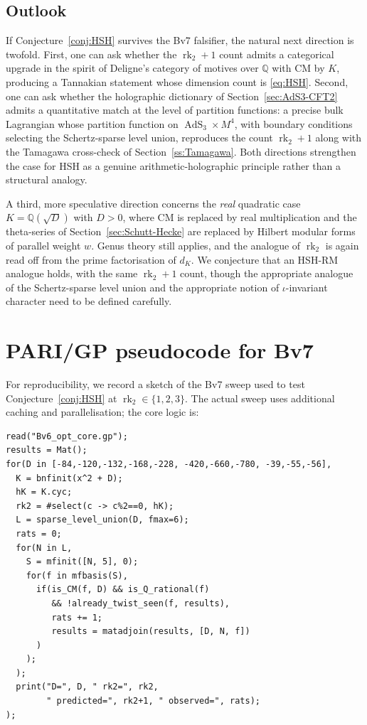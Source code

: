 \documentclass[11pt,a4paper]{amsart}
\theoremstyle{definition}
\DeclareMathOperator{\rk}{rk}
\DeclareMathOperator{\AdS}{AdS}
\newcommand{\Q}{\mathbb{Q}}
\newcommand{\rktwo}{\rk_{2}}
\begin{document}
\subsection{Outlook}\label{ss:outlook}

If Conjecture~\ref{conj:HSH} survives the Bv7 falsifier, the natural next direction is
twofold. First, one can ask whether the $\rktwo + 1$ count admits a categorical
upgrade in the spirit of Deligne's category of motives over $\Q$ with CM by $K$,
producing a Tannakian statement whose dimension count is \eqref{eq:HSH}. Second, one
can ask whether the holographic dictionary of Section~\ref{sec:AdS3-CFT2} admits a
quantitative match at the level of partition functions: a precise bulk Lagrangian
whose partition function on $\AdS_3 \times M^4$, with boundary conditions selecting
the Schertz-sparse level union, reproduces the count $\rktwo + 1$ along with the
Tamagawa cross-check of Section~\ref{ss:Tamagawa}. Both directions strengthen the
case for HSH as a genuine arithmetic-holographic principle rather than a structural
analogy.

A third, more speculative direction concerns the \emph{real} quadratic case
$K = \Q(\sqrt D)$ with $D > 0$, where CM is replaced by real multiplication and the
theta-series of Section~\ref{sec:Schutt-Hecke} are replaced by Hilbert modular forms
of parallel weight $w$. Genus theory still applies, and the analogue of $\rktwo$ is
again read off from the prime factorisation of $d_K$. We conjecture that an HSH-RM
analogue holds, with the same $\rktwo + 1$ count, though the appropriate analogue of the
Schertz-sparse level union and the appropriate notion of $\iota$-invariant character
need to be defined carefully.

\appendix

\section{PARI/GP pseudocode for Bv7}\label{app:Bv7-pseudo}

For reproducibility, we record a sketch of the Bv7 sweep used to test
Conjecture~\ref{conj:HSH} at $\rktwo \in \{1, 2, 3\}$. The actual sweep uses additional
caching and parallelisation; the core logic is:

\begin{verbatim}
read("Bv6_opt_core.gp");
results = Mat();
for(D in [-84,-120,-132,-168,-228, -420,-660,-780, -39,-55,-56],
  K = bnfinit(x^2 + D);
  hK = K.cyc;
  rk2 = #select(c -> c%2==0, hK);
  L = sparse_level_union(D, fmax=6);
  rats = 0;
  for(N in L,
    S = mfinit([N, 5], 0);
    for(f in mfbasis(S),
      if(is_CM(f, D) && is_Q_rational(f)
         && !already_twist_seen(f, results),
         rats += 1;
         results = matadjoin(results, [D, N, f])
      )
    );
  );
  print("D=", D, " rk2=", rk2,
        " predicted=", rk2+1, " observed=", rats);
);
\end{verbatim}
\end{document}
